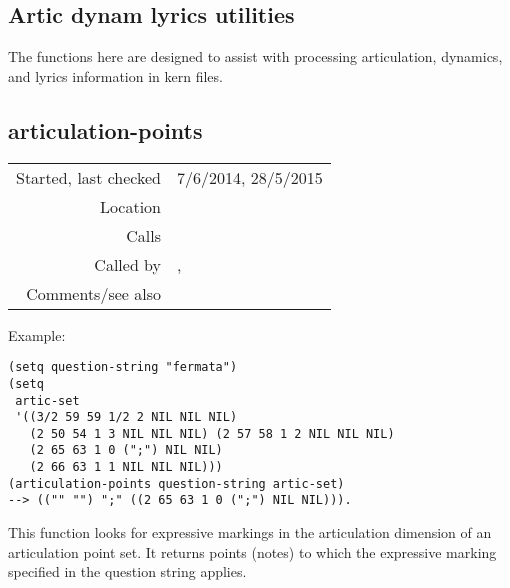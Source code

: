 \subsection{Artic dynam lyrics utilities}\label{sec:artic-dynam-lyrics-utilities}

The functions here are designed to assist
with processing articulation, dynamics, and lyrics
information in kern files.


\subsection*{articulation-points}\label{fun:articulation-points}

\vspace{0.3cm}
\begin{tabular}{r|p{8cm}}
Started, last checked & 7/6/2014, 28/5/2015 \\
Location & \nameref{sec:analytic-string-manipulations} \\
Calls & \\
Called by & \nameref{fun:articulation-and-event-time-intervals}, \nameref{fun:kern-file2phrase-boundary-states} \\
Comments/see also &
\end{tabular}

\vspace{0.5cm}
\noindent Example:
\begin{verbatim}
(setq question-string "fermata")
(setq
 artic-set
 '((3/2 59 59 1/2 2 NIL NIL NIL)
   (2 50 54 1 3 NIL NIL NIL) (2 57 58 1 2 NIL NIL NIL)
   (2 65 63 1 0 (";") NIL NIL)
   (2 66 63 1 1 NIL NIL NIL)))
(articulation-points question-string artic-set)
--> (("" "") ";" ((2 65 63 1 0 (";") NIL NIL))).
\end{verbatim}

\noindent This function looks for expressive markings
in the articulation dimension of an articulation point
set. It returns points (notes) to which the expressive
marking specified in the question string applies.


